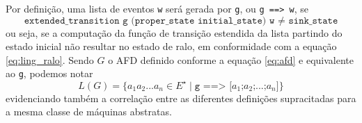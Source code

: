 Por definição, uma lista de eventos \texttt{w} será gerada por \texttt{g}, ou \texttt{g ==> w}, se $$\texttt{extended\_transition g (proper\_state initial\_state) w $\neq$ sink\_state}$$ ou seja, se a computação da função de transição estendida da lista partindo do estado inicial não resultar no estado de ralo, em conformidade com a equação \ref{eq:ling_ralo}. Sendo $G$ o AFD definido conforme a equação \ref{eq:afd} e equivalente ao \texttt{g}, podemos notar $$L(G) = \{ a_1a_2...a_n \in E^\star \mid \texttt{g ==> [$a_1$;$a_2$;$...$;$a_n$]} \}$$ evidenciando também a correlação entre as diferentes definições supracitadas para a mesma classe de máquinas abstratas.